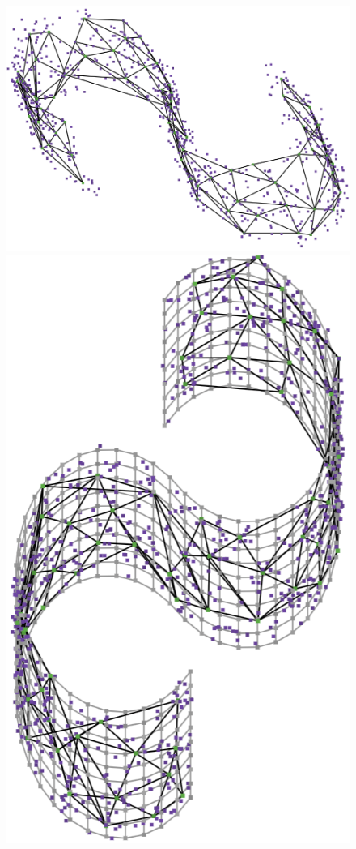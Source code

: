 \documentclass[
  12pt]{article}
\begin{document}
\begin{figure}[H]
%
\begin{minipage}{0.25\linewidth}
\includegraphics{figures/scurve/sc_tsne_best_2.png}\end{minipage}%
%
\begin{minipage}{0.25\linewidth}
\includegraphics{figures/scurve/sc_tsne_best_3.png}\end{minipage}%


\end{figure}
\end{document}
